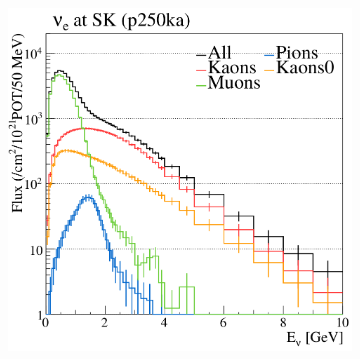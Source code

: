 \begin{figure}[h]
\begin{subfigure}[t]{0.32\textwidth}
		\includegraphics[width=\textwidth, trim={0mm 0mm 0mm 0mm}, clip,page=1]{figures/det_chap/beam/nue_sk_parents}
	\end{subfigure}


\end{figure}
